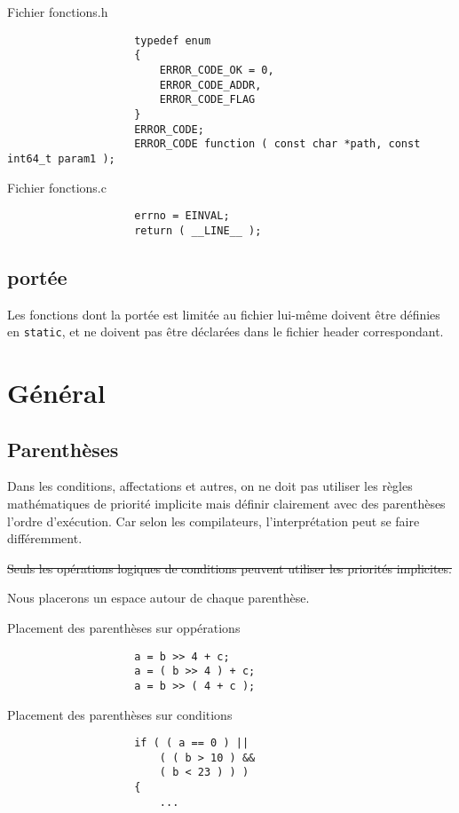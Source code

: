 			\begin{cbox}{Fichier fonctions.h}
				\begin{verbatim}
					typedef enum
					{
					    ERROR_CODE_OK = 0,
					    ERROR_CODE_ADDR,
					    ERROR_CODE_FLAG
					}
					ERROR_CODE;
					ERROR_CODE function ( const char *path, const int64_t param1 );
				\end{verbatim}
			\end{cbox}

			\begin{cbox}{Fichier fonctions.c}
				\begin{verbatim}
					errno = EINVAL;
					return ( __LINE__ );
				\end{verbatim}
			\end{cbox}

		\subsection{portée}
			Les fonctions dont la portée est limitée au fichier lui-même doivent être définies en \verb+static+, et ne doivent pas être déclarées dans le fichier header correspondant.

	\section{Général}
		\subsection{Parenthèses}
			Dans les conditions, affectations et autres, on ne doit pas utiliser les règles mathématiques de priorité implicite mais définir clairement avec des parenthèses l'ordre d'exécution. Car selon les compilateurs, l'interprétation peut se faire différemment.

			\sout{Seuls les opérations logiques de conditions peuvent utiliser les priorités implicites.}

			Nous placerons un espace autour de chaque parenthèse.

			\begin{cbox}{Placement des parenthèses sur oppérations}
				\begin{verbatim}
					a = b >> 4 + c;
					a = ( b >> 4 ) + c;
					a = b >> ( 4 + c );
				\end{verbatim}
			\end{cbox}

			\begin{cbox}{Placement des parenthèses sur conditions}
				\begin{verbatim}
					if ( ( a == 0 ) ||
					    ( ( b > 10 ) &&
					    ( b < 23 ) ) )
					{
					    ...
				\end{verbatim}
			\end{cbox}

